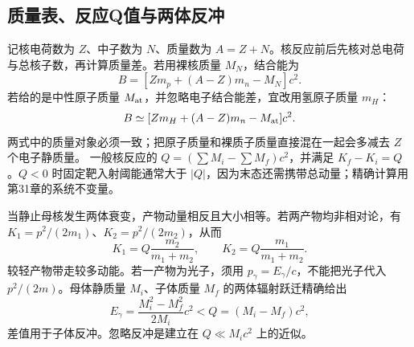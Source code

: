 \subsection{质量表、反应Q值与两体反冲}
记核电荷数为 $Z$、中子数为 $N$、质量数为 $A=Z+N$。核反应前后先核对总电荷与总核子数，再计算质量差。若用裸核质量 $M_N$，结合能为
\[
 B=[Zm_p+(A-Z)m_n-M_N]c^2.
\]
若给的是中性原子质量 $M_{\rm at}$，并忽略电子结合能差，宜改用氢原子质量 $m_H$：
\[
 B\simeq[Zm_H+(A-Z)m_n-M_{\rm at}]c^2.
\]
两式中的质量对象必须一致；把原子质量和裸质子质量直接混在一起会多减去 $Z$ 个电子静质量。
一般核反应的 $Q=(\sum M_i-\sum M_f)c^2$，并满足 $K_f-K_i=Q$。$Q<0$ 时固定靶入射阈能通常大于 $|Q|$，因为末态还需携带总动量；精确计算用第31章的系统不变量。

当静止母核发生两体衰变，产物动量相反且大小相等。若两产物均非相对论，有 $K_1=p^2/(2m_1)$、$K_2=p^2/(2m_2)$，从而
\[
 K_1=Q\frac{m_2}{m_1+m_2},\qquad
 K_2=Q\frac{m_1}{m_1+m_2}.
\]
较轻产物带走较多动能。若一产物为光子，须用 $p_\gamma=E_\gamma/c$，不能把光子代入 $p^2/(2m)$。母体静质量 $M_i$、子体质量 $M_f$ 的两体辐射跃迁精确给出
\[
 E_\gamma=\frac{M_i^2-M_f^2}{2M_i}c^2<Q=(M_i-M_f)c^2,
\]
差值用于子体反冲。忽略反冲是建立在 $Q\ll M_ic^2$ 上的近似。
